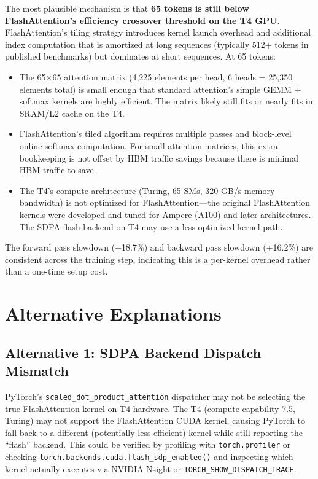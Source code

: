 \documentclass[12pt, a4paper]{article}
\begin{document}
The most plausible mechanism is that \textbf{65 tokens is still below FlashAttention's efficiency crossover threshold on the T4 GPU}. FlashAttention's tiling strategy introduces kernel launch overhead and additional index computation that is amortized at long sequences (typically 512+ tokens in published benchmarks) but dominates at short sequences. At 65 tokens:

\begin{itemize}
    \item The 65$\times$65 attention matrix (4,225 elements per head, 6 heads = 25,350 elements total) is small enough that standard attention's simple GEMM + softmax kernels are highly efficient. The matrix likely still fits or nearly fits in SRAM/L2 cache on the T4.
    \item FlashAttention's tiled algorithm requires multiple passes and block-level online softmax computation. For small attention matrices, this extra bookkeeping is not offset by HBM traffic savings because there is minimal HBM traffic to save.
    \item The T4's compute architecture (Turing, 65 SMs, 320 GB/s memory bandwidth) is not optimized for FlashAttention---the original FlashAttention kernels were developed and tuned for Ampere (A100) and later architectures. The SDPA flash backend on T4 may use a less optimized kernel path.
\end{itemize}

The forward pass slowdown (+18.7\%) and backward pass slowdown (+16.2\%) are consistent across the training step, indicating this is a per-kernel overhead rather than a one-time setup cost.

\section{Alternative Explanations}

\subsection{Alternative 1: SDPA Backend Dispatch Mismatch}

PyTorch's \texttt{scaled\_dot\_product\_attention} dispatcher may not be selecting the true FlashAttention kernel on T4 hardware. The T4 (compute capability 7.5, Turing) may not support the FlashAttention CUDA kernel, causing PyTorch to fall back to a different (potentially less efficient) kernel while still reporting the ``flash'' backend. This could be verified by profiling with \texttt{torch.profiler} or checking \texttt{torch.backends.cuda.flash\_sdp\_enabled()} and inspecting which kernel actually executes via NVIDIA Nsight or \texttt{TORCH\_SHOW\_DISPATCH\_TRACE}.
\end{document}
